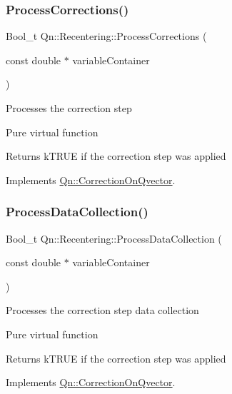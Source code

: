\subsubsection{\texorpdfstring{Process\+Corrections()}{ProcessCorrections()}}
{\footnotesize\ttfamily Bool\+\_\+t Qn\+::\+Recentering\+::\+Process\+Corrections (\begin{DoxyParamCaption}\item[{const double $\ast$}]{variable\+Container }\end{DoxyParamCaption})\hspace{0.3cm}{\ttfamily [virtual]}}

Processes the correction step

Pure virtual function \begin{DoxyReturn}{Returns}
k\+T\+R\+UE if the correction step was applied 
\end{DoxyReturn}


Implements \mbox{\hyperlink{classQn_1_1CorrectionOnQvector_a2c2d7f0e48471fb9269f0b5f9aa3e836}{Qn\+::\+Correction\+On\+Qvector}}.

\mbox{\label{classQn_1_1Recentering_a1e3efc8b261021b21732474eb7afa3ca}} 
\subsubsection{\texorpdfstring{Process\+Data\+Collection()}{ProcessDataCollection()}}
{\footnotesize\ttfamily Bool\+\_\+t Qn\+::\+Recentering\+::\+Process\+Data\+Collection (\begin{DoxyParamCaption}\item[{const double $\ast$}]{variable\+Container }\end{DoxyParamCaption})\hspace{0.3cm}{\ttfamily [virtual]}}

Processes the correction step data collection

Pure virtual function \begin{DoxyReturn}{Returns}
k\+T\+R\+UE if the correction step was applied 
\end{DoxyReturn}


Implements \mbox{\hyperlink{classQn_1_1CorrectionOnQvector_a2c0a668d885b5a42503869303c859a0b}{Qn\+::\+Correction\+On\+Qvector}}.

